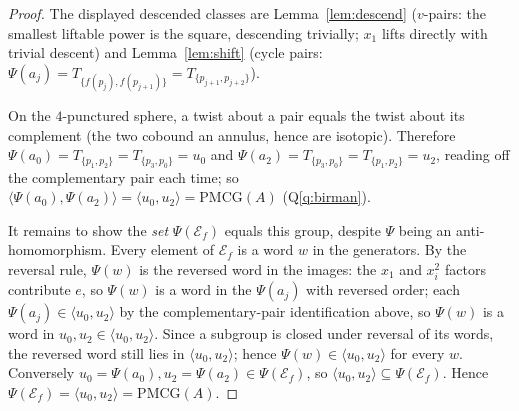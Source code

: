 \documentclass[11pt]{article}
\newcommand{\Ef}{\mathcal E_f}
\theoremstyle{definition}
\theoremstyle{remark}
\newcommand{\PMCG}{\mathrm{PMCG}}
\begin{document}
\begin{proof}
The displayed descended classes are Lemma~\ref{lem:descend}
\textup{(}$v$-pairs: the smallest liftable power is the square,
descending trivially; $x_1$ lifts directly with trivial
descent\textup{)} and Lemma~\ref{lem:shift} \textup{(}cycle pairs:
$\Psi(a_j)=T_{\{f(p_j),f(p_{j+1})\}}=T_{\{p_{j+1},p_{j+2}\}}$\textup{)}.

On the $4$-punctured sphere, a twist about a pair equals the twist
about its complement \textup{(}the two cobound an annulus, hence are
isotopic\textup{)}.  Therefore
$\Psi(a_0)=T_{\{p_1,p_2\}}=T_{\{p_3,p_0\}}=u_0$ and
$\Psi(a_2)=T_{\{p_3,p_0\}}=T_{\{p_1,p_2\}}=u_2$, reading off the
complementary pair each time; so
$\langle\Psi(a_0),\Psi(a_2)\rangle=\langle u_0,u_2\rangle=\PMCG(A)$
\textup{(}Q\ref{q:birman}\textup{)}.

It remains to show the \emph{set} $\Psi(\Ef)$ equals this group,
despite $\Psi$ being an anti-homomorphism.  Every element of $\Ef$ is
a word $w$ in the generators.  By the reversal rule,
$\Psi(w)$ is the reversed word in the images: the $x_1$ and $x_i^{2}$
factors contribute $e$, so $\Psi(w)$ is a word in the
$\Psi(a_j)$ with reversed order; each
$\Psi(a_j)\in\langle u_0,u_2\rangle$ by the complementary-pair
identification above, so $\Psi(w)$ is a word in
$u_0,u_2\in\langle u_0,u_2\rangle$.  Since a subgroup is closed under
reversal of its words, the reversed word still lies in
$\langle u_0,u_2\rangle$; hence $\Psi(w)\in\langle u_0,u_2\rangle$ for
every $w$.  Conversely $u_0=\Psi(a_0),u_2=\Psi(a_2)\in\Psi(\Ef)$, so
$\langle u_0,u_2\rangle\subseteq\Psi(\Ef)$.  Hence
$\Psi(\Ef)=\langle u_0,u_2\rangle=\PMCG(A)$.
\end{proof}
\end{document}
